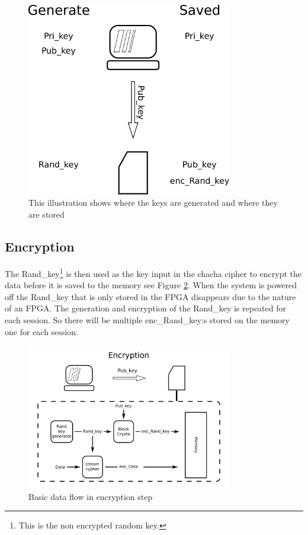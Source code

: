 \documentclass[]{article}
\begin{document}
\begin{figure}[h]
	\centering
	\includegraphics[width=0.8\textwidth]{ilustrations/Key_generations.pdf}
	\caption{This illustration shows where the keys are generated and where they are stored}
	\label{fig:key_gen}
\end{figure}
\clearpage
\newpage
\subsection{Encryption}
The Rand\_key\footnote{This is the non encrypted random key.} is then used as the key input in the chacha cipher to encrypt the data before it is saved to the memory see Figure \ref{fig:encrypt}.
When the system is powered off the Rand\_key that is only stored in the FPGA disappears due to the nature of an FPGA.
The generation and encryption of the Rand\_key is repeated for each session.
So there will be multiple enc\_Rand\_key:s stored on the memory one for each session.

\begin{figure}[h]
	\centering
	\includegraphics[width=0.8\textwidth]{ilustrations/encryption.pdf}
	\caption{Basic data flow in encryption step}
	\label{fig:encrypt}
\end{figure}
\clearpage
\newpage
\end{document}
